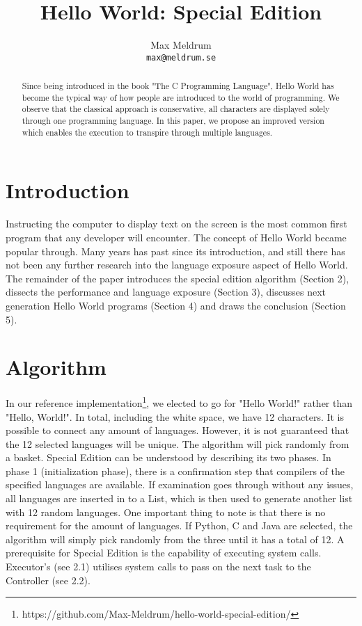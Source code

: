 \documentclass[11pt]{article}
\title{Hello World: Special Edition}
\author{Max Meldrum \\
{\tt max@meldrum.se}}
\date{}
\begin{document}
\maketitle
\begin{abstract}
Since being introduced in the book "The C Programming Language", Hello World has become the typical way of how people are introduced to the world of programming. We observe that the classical approach is conservative, all characters are displayed solely through one programming language. In this paper, we propose an improved version which enables the execution to transpire through multiple languages.
\end{abstract}

\section{Introduction}
Instructing the computer to display text on the screen is the most common first program that any developer will encounter. The concept of Hello World became popular through\cite{Kernighan:1988:CPL:576122}. Many years has past since its introduction, and still there has not been any further research into the language exposure aspect of Hello World.
\newline{}\newline{}
The remainder of the paper introduces the special edition algorithm (Section 2), dissects the performance and language exposure (Section 3), discusses next generation Hello World programs (Section 4) and draws the conclusion (Section 5).

\section{Algorithm}
In our reference implementation\footnote{https://github.com/Max-Meldrum/hello-world-special-edition/}, we elected to go for "Hello World!" rather than "Hello, World!". In total, including the white space, we have 12 characters. It is possible to connect any amount of languages. However, it is not guaranteed that the 12 selected languages will be unique. The algorithm will pick randomly from a basket.
\newline{}\newline{}
Special Edition can be understood by describing its two phases. In phase 1 (initialization phase), there is a confirmation step that compilers of the specified languages are available. If examination goes through without any issues, all languages are inserted in to a List, which is then used to generate another list with 12 random languages. One important thing to note is that there is no requirement for the amount of languages. If Python, C and Java are selected, the algorithm will simply pick randomly from the three until it has a total of 12.
\newline{}\newline{}
A prerequisite for Special Edition is the capability of executing system calls. Executor's (see 2.1) utilises system calls to pass on the next task to the Controller (see 2.2).
\end{document}
